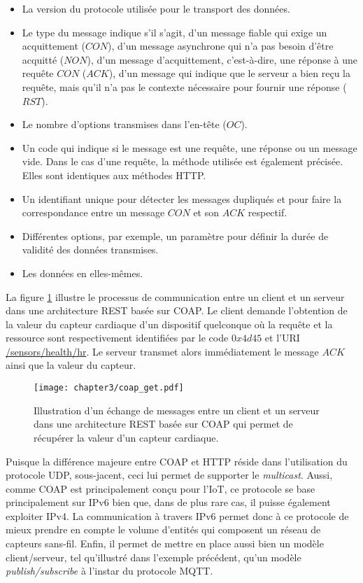 \begin{itemize}[label=\textbullet]
    \item
        La version du protocole utilisée pour le transport des données.
    \item
        Le type du message indique s'il s'agit, d'un message fiable qui exige un acquittement ($CON$), d'un message asynchrone qui n’a pas besoin d’être acquitté ($NON$), d'un message d’acquittement, c'est-à-dire, une réponse à une requête $CON$ ($ACK$), d'un message qui indique que le serveur a bien reçu la requête, mais qu'il n’a pas le contexte nécessaire pour fournir une réponse ($RST$).
    \item
        Le nombre d'options transmises dans l'en-tête ($OC$).
    \item
        Un code qui indique si le message est une requête, une réponse ou un message vide. Dans le cas d’une requête, la méthode utilisée est également précisée. Elles sont identiques aux méthodes \ac{HTTP}.
    \item
        Un identifiant unique pour détecter les messages dupliqués et pour faire la correspondance entre un message $CON$ et son $ACK$ respectif.
    \item
        Différentes options, par exemple, un paramètre pour définir la durée de validité des données transmises.
    \item
        Les données en elles-mêmes.
\end{itemize}

\noindent La figure \ref{fig:coap_get} illustre le processus de communication entre un client et un serveur dans une architecture \ac{REST} basée sur \ac{COAP}. Le client demande l'obtention de la valeur du capteur cardiaque d'un dispositif quelconque où la requête et la ressource sont respectivement identifiées par le code $0x4d45$ et l'\ac{URI} \url{/sensors/health/hr}. Le serveur transmet alors immédiatement le message $ACK$ ainsi que la valeur du capteur.

\begin{figure}[H]
	\centering
	\texttt{[image: chapter3/coap\_get.pdf]}
        \caption{Illustration d'un échange de messages entre un client et un serveur dans une architecture \ac{REST} basée sur \ac{COAP} qui permet de récupérer la valeur d'un capteur cardiaque.}
	\label{fig:coap_get}
\end{figure}

Puisque la différence majeure entre \ac{COAP} et \ac{HTTP} réside dans l'utilisation du protocole \ac{UDP}, sous-jacent, ceci lui permet de supporter le \textit{multicast}. Aussi, comme \ac{COAP} est principalement conçu pour l'\acs{IoT}, ce protocole se base principalement sur IPv6 bien que, dans de plus rare cas, il puisse également exploiter IPv4. La communication à travers IPv6 permet donc à ce protocole de mieux prendre en compte le volume d'entités qui composent un réseau de capteurs sans-fil. Enfin, il permet de mettre en place aussi bien un modèle client/serveur, tel qu'illustré dans l'exemple précédent, qu'un modèle \textit{publish/subscribe} à l'instar du protocole \ac{MQTT}.


